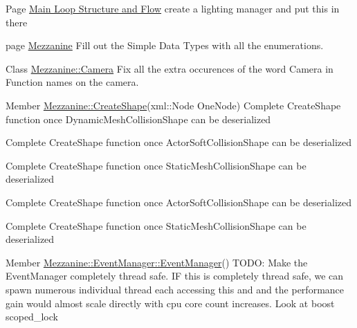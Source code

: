\label{todo__todo000029}
\hypertarget{todo__todo000029}{}
 
\begin{DoxyDescription}
\item[Page \hyperlink{mainloop1}{Main Loop Structure and Flow} ]create a lighting manager and put this in there 
\end{DoxyDescription}

\label{todo__todo000030}
\hypertarget{todo__todo000030}{}
 
\begin{DoxyDescription}
\item[page \hyperlink{index}{Mezzanine} ]Fill out the Simple Data Types with all the enumerations.
\end{DoxyDescription}

\label{todo__todo000002}
\hypertarget{todo__todo000002}{}
 
\begin{DoxyDescription}
\item[Class \hyperlink{classMezzanine_1_1Camera}{Mezzanine::Camera} ]Fix all the extra occurences of the word Camera in Function names on the camera. 
\end{DoxyDescription}

\label{todo__todo000004}
\hypertarget{todo__todo000004}{}
 
\begin{DoxyDescription}
\item[Member \hyperlink{namespaceMezzanine_ac7be2623357ff699de474212404a4227}{Mezzanine::CreateShape}(xml::Node OneNode) ]Complete CreateShape function once DynamicMeshCollisionShape can be deserialized 

Complete CreateShape function once ActorSoftCollisionShape can be deserialized 

Complete CreateShape function once StaticMeshCollisionShape can be deserialized 

Complete CreateShape function once ActorSoftCollisionShape can be deserialized 

Complete CreateShape function once StaticMeshCollisionShape can be deserialized 
\end{DoxyDescription}

\label{todo__todo000010}
\hypertarget{todo__todo000010}{}
 
\begin{DoxyDescription}
\item[Member \hyperlink{classMezzanine_1_1EventManager_a95ce9d2d865b0d8d9468448969b0ade2}{Mezzanine::EventManager::EventManager}() ]TODO: Make the EventManager completely thread safe. IF this is completely thread safe, we can spawn numerous individual thread each accessing this and and the performance gain would almost scale directly with cpu core count increases. Look at boost scoped\_\-lock 
\end{DoxyDescription}

